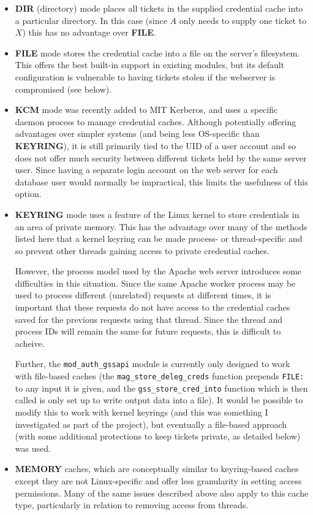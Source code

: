 \documentclass{article}
\begin{document}
\begin{itemize}
\item
  \textbf{DIR} (directory) mode places all tickets in the supplied credential cache into a particular directory. In this case (since $A$ only needs to supply one ticket to $X$) this has no advantage over \textbf{FILE}.
\item
  \textbf{FILE} mode stores the credential cache into a file on the server's filesystem. This offers the best built-in support in existing modules, but its default configuration is vulnerable to having tickets stolen if the webserver is compromised (see below).
\item
  \textbf{KCM} mode was recently added to MIT Kerberos, and uses a specific daemon process to manage credential caches. Although potentially offering advantages over simpler systems (and being less OS-specific than \textbf{KEYRING}), it is still primarily tied to the UID of a user account and so does not offer much security between different tickets held by the same server user. Since having a separate login account on the web server for each database user would normally be impractical, this limits the usefulness of this option.
\item
  \textbf{KEYRING} mode uses a feature of the Linux kernel to store credentials in an area of private memory. This has the advantage over many of the methods listed here that a kernel keyring can be made process- or thread-specific and so prevent other threads gaining access to private credential caches.

  However, the process model used by the Apache web server introduces some difficulties in this situation. Since the same Apache worker process may be used to process different (unrelated) requests at different times, it is important that these requests do not have access to the credential caches saved for the previous requests using that thread. Since the thread and process IDs will remain the same for future requests, this is difficult to acheive.

  Further, the \verb+mod_auth_gssapi+ module is currently only designed to work with file-based caches (the \verb+mag_store_deleg_creds+ function prepends \texttt{FILE:} to any input it is given, and the \verb+gss_store_cred_into+ function which is then called is only set up to write output data into a file). It would be possible to modify this to work with kernel keyrings (and this was something I investigated as part of the project), but eventually a file-based approach (with some additional protections to keep tickets private, as detailed below) was used.
\item
  \textbf{MEMORY} caches, which are conceptually similar to keyring-based caches except they are not Linux-specific and offer less granularity in setting access permissions. Many of the same issues described above also apply to this cache type, particularly in relation to removing access from threads.
\end{itemize}
\end{document}
